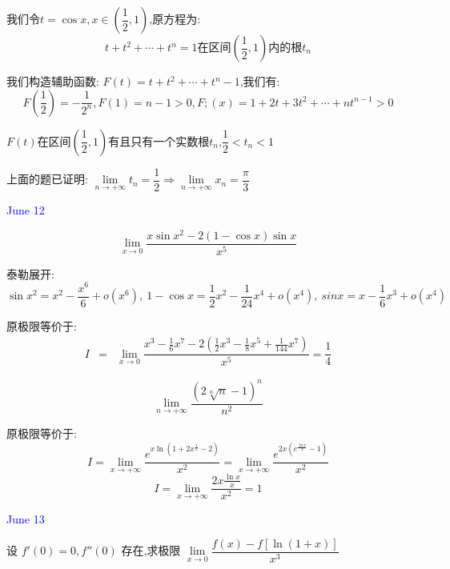 \begin{solution}
	
	我们令$t=\cos x,x\in(\dfrac{1}{2},1)$,原方程为: 
	$$t+t^2+\cdots+t^{n}=1\text{在区间}(\dfrac{1}{2},1)\text{内的根}t_{n}$$
	
	我们构造辅助函数: $F(t)=t+t^2+\cdots+t^{n}-1$,我们有: 
	$$F(\dfrac{1}{2})=-\dfrac{1}{2^n},F(1)=n-1>0,F;(x)=1+2t+3t^2+\cdots+nt^{n-1}>0$$
	
	$F(t)$在区间$(\dfrac{1}{2},1)$有且只有一个实数根$t_{n}$,$\dfrac{1}{2}<t_{n}<1$
	
	上面的题已证明: $\lim\limits_{n\to+\infty}t_{n}=\dfrac{1}{2}\Rightarrow\lim\limits_{n\to+\infty}x_{n}=\dfrac{\pi}{3}$
\end{solution}


\textcolor{blue}{June 12}

\begin{example}[][Exam: 32.2.9]
	$$\lim\limits_{x\to 0 }\dfrac{x\sin x^2-2(1-\cos x)\sin x}{x^5}$$
\end{example}

\begin{solution}
	
	泰勒展开: 
	$$\sin x^2=x^2-\dfrac{x^6}{6}+o(x^6),\ 1-\cos x=\dfrac{1}{2}x^2-\dfrac{1}{24}x^4+o(x^4),\ sin x=x-\dfrac{1}{6}x^3+o(x^4)$$
	
	原极限等价于: 
	\begin{eqnarray*}
		I&=&\lim\limits_{x\to 0}\dfrac{x^3-\frac{1}{6}x^7-2(\frac{1}{2}x^3-\frac{1}{8}x^5+\frac{1}{144}x^7)}{x^5}=\dfrac{1}{4}
	\end{eqnarray*}
\end{solution}

\begin{example}[][Exam: 32.2.10]
	$$\lim\limits_{n\to +\infty}\dfrac{(2\sqrt[n]{n}-1)^n}{n^2}$$
\end{example}

\begin{solution}
	
	原极限等价于: 
	$$I=\lim\limits_{x\to +\infty}\dfrac{e^{x\ln(1+2x^{\frac{1}{x}}-2)}}{x^2}=\lim\limits_{x\to +\infty}\dfrac{e^{2x(e^{\frac{\ln x}{x}}-1)}}{x^2}$$
	$$I=\lim\limits_{x\to +\infty}\dfrac{2x\frac{\ln x}{x}}{x^2}=1$$
\end{solution}


\textcolor{blue}{June 13}

\begin{example}[][Exam: 32.2.11]
	设 $f'(0)=0,f''(0)$ 存在,求极限 $\lim\limits_{x\to 0}\dfrac{f(x)-f[\ln(1+x)]}{x^3}$
\end{example}

